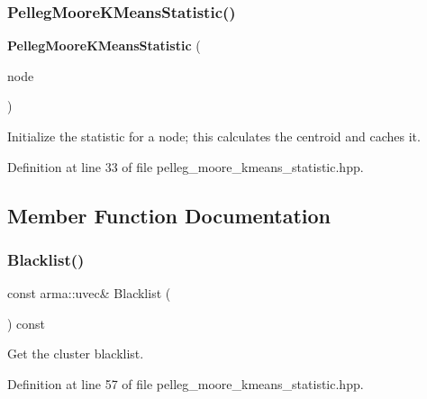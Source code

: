 \subsubsection{Pelleg\+Moore\+K\+Means\+Statistic()\hspace{0.1cm}{\footnotesize\ttfamily [2/2]}}
{\footnotesize\ttfamily \textbf{ Pelleg\+Moore\+K\+Means\+Statistic} (\begin{DoxyParamCaption}\item[{Tree\+Type \&}]{node }\end{DoxyParamCaption})\hspace{0.3cm}{\ttfamily [inline]}}



Initialize the statistic for a node; this calculates the centroid and caches it. 



Definition at line 33 of file pelleg\+\_\+moore\+\_\+kmeans\+\_\+statistic.\+hpp.



\subsection{Member Function Documentation}
\mbox{\label{classmlpack_1_1kmeans_1_1PellegMooreKMeansStatistic_afb656efc6b69a7d77423276348a75c6e}} 
\subsubsection{Blacklist()\hspace{0.1cm}{\footnotesize\ttfamily [1/2]}}
{\footnotesize\ttfamily const arma\+::uvec\& Blacklist (\begin{DoxyParamCaption}{ }\end{DoxyParamCaption}) const\hspace{0.3cm}{\ttfamily [inline]}}



Get the cluster blacklist. 



Definition at line 57 of file pelleg\+\_\+moore\+\_\+kmeans\+\_\+statistic.\+hpp.

\mbox{\label{classmlpack_1_1kmeans_1_1PellegMooreKMeansStatistic_a28e7826933df4b13a45abc649a34f44a}} 
